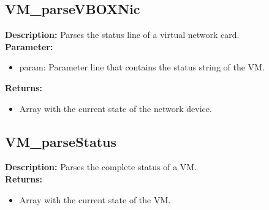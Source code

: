 \subsection{VM\_parseVBOXNic}
\textbf{Description:} Parses the status line of a virtual network card.\\
\textbf{Parameter:}
\begin{itemize}
\item param: Parameter line that contains the status string of the VM.
\end{itemize}
\textbf{Returns:}
\begin{itemize}
\item Array with the current state of the network device.
\end{itemize}

\subsection{VM\_parseStatus}
\textbf{Description:} Parses the complete status of a VM.\\
\textbf{Returns:}
\begin{itemize}
\item Array with the current state of the VM.
\end{itemize}
